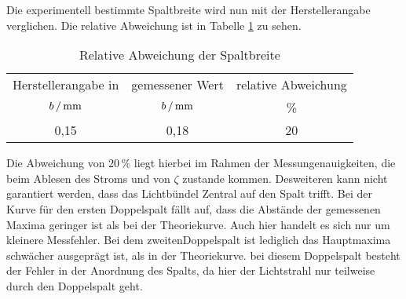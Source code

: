 Die experimentell bestimmte Spaltbreite wird nun mit der Herstellerangabe verglichen.
Die relative Abweichung ist in Tabelle \ref{tab:rel} zu sehen.
\begin{table}
  \centering
  \caption{Relative Abweichung der Spaltbreite}
  \begin{tabular}{ccc}
    \toprule
    Herstellerangabe in & gemessener Wert & relative Abweichung \\
    $b\,/\,\si{\milli\meter}$ & $b\,/\,\si{\milli\meter}$ & \% \\
    \midrule
    0,15 & 0,18 & 20 \\
    \bottomrule
  \end{tabular}
  \label{tab:rel}
\end{table}
Die Abweichung von $20\,\%$ liegt hierbei im Rahmen der Messungenauigkeiten, die
beim Ablesen des Stroms und von $\zeta$ zustande kommen. Desweiteren kann nicht
garantiert werden, dass das Lichtbündel Zentral auf den Spalt trifft.
Bei der Kurve für den ersten Doppelspalt fällt auf, dass die Abstände der
gemessenen Maxima geringer ist als bei der Theoriekurve. Auch hier handelt es sich
nur um kleinere Messfehler. Bei dem zweitenDoppelspalt ist lediglich das Hauptmaxima
schwächer ausgeprägt ist, als in der Theoriekurve. bei diesem Doppelspalt besteht
 der Fehler in der Anordnung des Spalts, da hier der Lichtstrahl nur teilweise
 durch den Doppelspalt geht.
